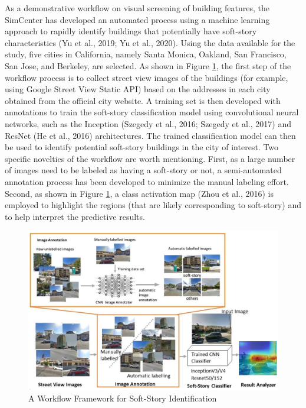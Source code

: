As a demonstrative workflow on visual screening of building features, the SimCenter has developed an automated process using a machine learning approach to rapidly identify buildings that potentially have soft-story characteristics (Yu et al., 2019; Yu et al., 2020). Using the data available for the study, five cities in California, namely Santa Monica, Oakland, San Francisco, San Jose, and Berkeley, are selected. As shown in Figure \ref{fig:soft_story_identification}, the first step of the workflow process is to collect street view images of the buildings (for example, using Google Street View Static API) based on the addresses in each city obtained from the official city website. A training set is then developed with annotations to train the soft-story classification model using convolutional neural networks, such as the Inception (Szegedy et al., 2016; Szegedy et al., 2017) and ResNet (He et al., 2016) architectures. The trained classification model can then be used to identify potential soft-story buildings in the city of interest. Two specific novelties of the workflow are worth mentioning. First, as a large number of images need to be labeled as having a soft-story or not, a semi-automated annotation process has been developed to minimize the manual labeling effort. Second, as shown in Figure \ref{fig:soft_story_identification}, a class activation map (Zhou et al., 2016) is employed to highlight the regions (that are likely corresponding to soft-story) and to help interpret the predictive results.

\begin{figure}[htb]
    \centering
    \includegraphics[width=1.0\textwidth, angle = 0]{Figures/soft_story_identification.png}
    \caption{A Workflow Framework for Soft-Story Identification}
    \label{fig:soft_story_identification}
\end{figure}

